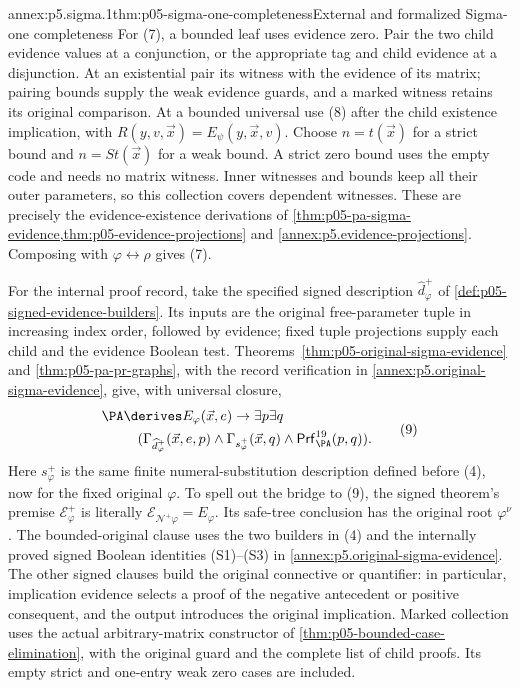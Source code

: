 \begin{annexitem}{annex:p5.sigma.1}{thm:p05-sigma-one-completeness}{External and formalized Sigma-one completeness}
For (7), a bounded leaf uses evidence zero. Pair the two child evidence
values at a conjunction, or the appropriate tag and child evidence at a
disjunction. At an existential pair its witness with the evidence of its
matrix; pairing bounds supply the weak evidence guards, and a marked
witness retains its original comparison. At a bounded universal use (8)
after the child existence implication, with
\(R(y,v,\vec x)=E_\psi(y,\vec x,v)\). Choose
\(n=t(\vec x)\) for a strict bound and \(n=St(\vec x)\) for a
weak bound. A strict zero bound uses the empty code and needs no matrix
witness. Inner witnesses and bounds keep all their outer parameters, so
this collection covers dependent witnesses. These are precisely the
evidence-existence derivations of
\cref{thm:p05-pa-sigma-evidence,thm:p05-evidence-projections} and
\cref{annex:p5.evidence-projections}. Composing with
\(\varphi\leftrightarrow\rho\) gives (7).

For the internal proof record, take the specified signed description
\(\widehat d_\varphi^+\) of
\cref{def:p05-signed-evidence-builders}. Its inputs are the original
free-parameter tuple in increasing index order, followed by evidence;
fixed tuple projections supply each child and the evidence Boolean test.
Theorems~\ref{thm:p05-original-sigma-evidence} and
\ref{thm:p05-pa-pr-graphs}, with the record verification in
\cref{annex:p5.original-sigma-evidence}, give, with universal closure,
\[
\begin{aligned}
 \PA&\derives E_\varphi(\vec x,e)\to\exists p\exists q\,\\
 &\quad(\Gamma_{\widehat d_\varphi^+}(\vec x,e,p)\land
   \Gamma_{s_\varphi^+}(\vec x,q)\land
   \mathsf{Prf}^{19}_{\PA}(p,q)).
\end{aligned}
\tag{9}
\]
Here \(s_\varphi^+\) is the same finite numeral-substitution description
defined before (4), now for the fixed original \(\varphi\). To spell
out the bridge to (9), the signed theorem's premise
\(\mathcal E_\varphi^+\) is literally
\(\mathcal E_{\mathcal N^+\varphi}=E_\varphi\). Its safe-tree
conclusion has the original root \(\varphi^\nu\). The bounded-original
clause uses the two builders in (4) and the internally proved signed
Boolean identities (S1)--(S3) in
\cref{annex:p5.original-sigma-evidence}. The other signed clauses build
the original connective or quantifier: in particular, implication evidence
selects a proof of the negative antecedent or positive consequent, and the
output introduces the original implication. Marked collection uses the
actual arbitrary-matrix constructor of
\cref{thm:p05-bounded-case-elimination}, with the original guard and
the complete list of child proofs. Its empty strict and one-entry weak
zero cases are included.


\end{annexitem}
